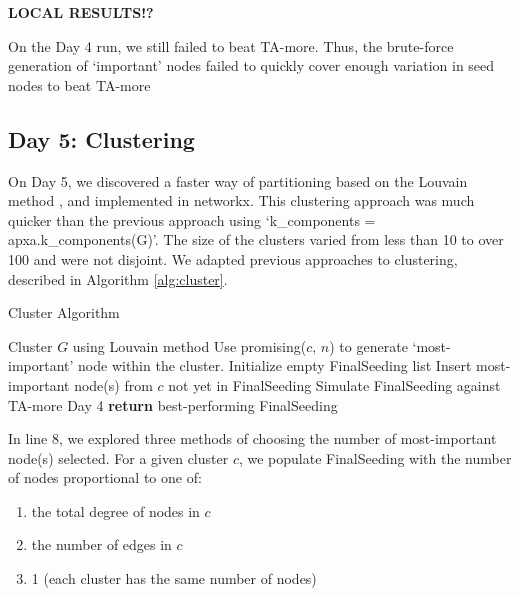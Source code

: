 \documentclass[letterpaper, 11pt]{article}
\begin{document}
\textbf{LOCAL RESULTS!?}

On the Day 4 run, we still failed to beat TA-more. Thus, the brute-force generation of `important' nodes failed to quickly cover enough variation in seed nodes to beat TA-more



\subsection{Day 5: Clustering}
On Day 5, we discovered a faster way of partitioning based on the Louvain method \cite{louvain}, and implemented in networkx. This clustering approach was much quicker than the previous approach using ‘k\_components = apxa.k\_components(G)’. The size of the clusters varied from less than 10 to over 100 and were not disjoint. We adapted previous approaches to clustering, described in Algorithm \ref{alg:cluster}.


\begin{algorithm}
\caption{Cluster Algorithm}
\begin{algorithmic}[1]
\State Cluster $G$ using Louvain method
\State Use promising($c$, $n$) to generate `most-important' node within the cluster.
\EndFor
{}
\State Initialize empty FinalSeeding list
\State Insert most-important node(s) from $c$ not yet in FinalSeeding
\EndFor
\State Simulate FinalSeeding against TA-more Day 4
\EndWhile
\EndFor
\State \textbf{return} best-performing FinalSeeding
\EndProcedure
\end{algorithmic}
\label{alg:cluster}
\end{algorithm}

In line 8, we explored three methods of choosing the number of most-important node(s) selected. For a given cluster $c$, we populate FinalSeeding with the number of nodes proportional to one of:
\begin{enumerate}[label=(\arabic*)]
\item the total degree of nodes in $c$
\item the number of edges in $c$
\item 1 (each cluster has the same number of nodes)
\end{enumerate}
\end{document}
